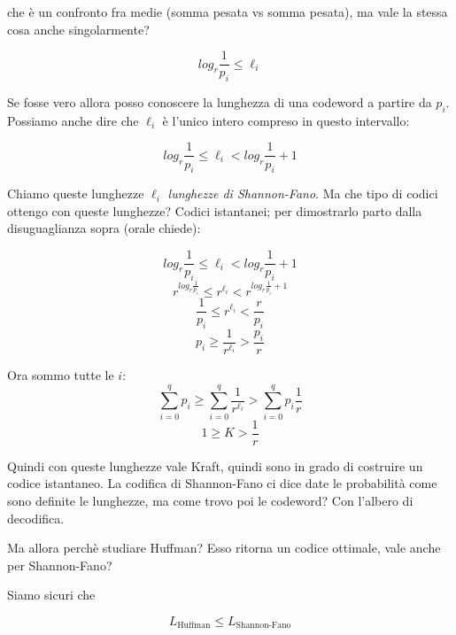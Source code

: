 che è un confronto fra medie (somma pesata vs somma pesata), ma vale la stessa cosa anche singolarmente?

\begin{equation*}
log_r\frac{1}{p_i} \leq \ell_i
\end{equation*}

Se fosse vero allora posso conoscere la lunghezza di una codeword a partire da $p_i$. Possiamo anche dire che $\ell_i$ è l'unico intero compreso in questo intervallo:

\begin{equation*}
log_r\frac{1}{p_i} \leq \ell_i < log_r\frac{1}{p_i} + 1
\end{equation*}

Chiamo queste lunghezze $\ell_i$ \textit{lunghezze di Shannon-Fano}.
Ma che tipo di codici ottengo con queste lunghezze? Codici istantanei; per dimostrarlo parto dalla disuguaglianza sopra (orale chiede):

\begin{equation*}
log_r\frac{1}{p_i} \leq \ell_i < log_r\frac{1}{p_i} + 1
\end{equation*}
\begin{equation*}
r^{log_r\frac{1}{p_i}} \leq r^{\ell_i} < r^{log_r\frac{1}{p_i} + 1}
\end{equation*}
\begin{equation*}
\frac{1}{p_i} \leq r^{\ell_i} < \frac{r}{p_i}
\end{equation*}
\begin{equation*}
p_i \geq \frac{1}{r^{\ell_i}} > \frac{p_i}{r}
\end{equation*}

Ora sommo tutte le $i$:
\begin{equation*}
\sum_{i=0}^qp_i \geq \sum_{i=0}^q\frac{1}{r^{\ell_i}} > \sum_{i=0}^qp_i\frac{1}{r}
\end{equation*}
\begin{equation*}
1\geq K > \frac{1}{r}
\end{equation*}

Quindi con queste lunghezze vale Kraft, quindi sono in grado di costruire un codice istantaneo.
La codifica di Shannon-Fano ci dice date le probabilità come sono definite le lunghezze, ma come trovo poi le codeword? Con l'albero di decodifica.

Ma allora perchè studiare Huffman? Esso ritorna un codice ottimale, vale anche per Shannon-Fano?

Siamo sicuri che 

\begin{equation*}
L_{\text{Huffman}} \leq L_{\text{Shannon-Fano}}
\end{equation*}


